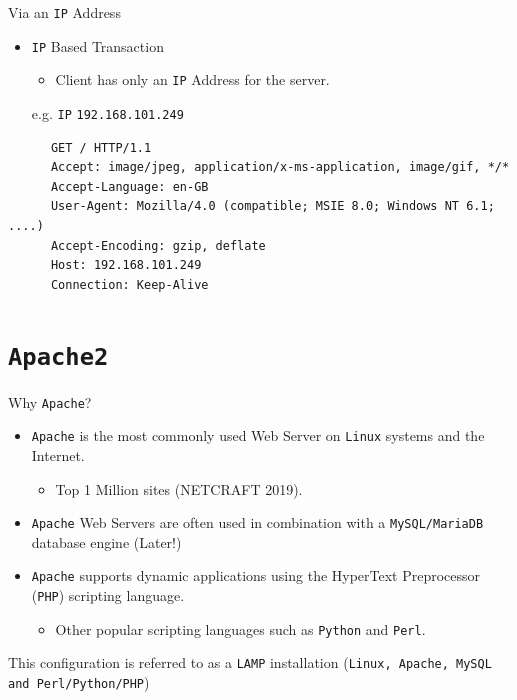 \documentclass[xcolor=table,aspectratio=169]{beamer}
\begin{document}
\begin{frame}[fragile]{Via an \texttt{IP} Address}
  \begin{itemize}
      \item \texttt{IP} Based Transaction
        \begin{itemize}
          \item Client has only an \texttt{IP} Address for the server.
        \end{itemize}
      \begin{center}
        e.g. \texttt{IP} \texttt{192.168.101.249}        
      \end{center}
    \end{itemize}
  \begin{tcolorbox}
    \lstset{
      basicstyle=\tiny\ttfamily,
    }
    \begin{lstlisting}
      GET / HTTP/1.1
      Accept: image/jpeg, application/x-ms-application, image/gif, */*
      Accept-Language: en-GB
      User-Agent: Mozilla/4.0 (compatible; MSIE 8.0; Windows NT 6.1; ....)
      Accept-Encoding: gzip, deflate
      Host: 192.168.101.249
      Connection: Keep-Alive
    \end{lstlisting}
  \end{tcolorbox}
\end{frame}

\section{\texttt{Apache2}}
\begin{frame}{Why \texttt{Apache}?}
  \begin{itemize}
    \item \texttt{Apache} is the most commonly used Web Server on \texttt{Linux} systems and the Internet.
      \begin{itemize}
        \item Top 1 Million sites (NETCRAFT 2019).
      \end{itemize}
    \item \texttt{Apache} Web Servers are often used in combination with a \texttt{MySQL/MariaDB} database engine (Later!)
    \item \texttt{Apache} supports dynamic applications using the HyperText Preprocessor (\texttt{PHP}) scripting language. 
      \begin{itemize}
        \item Other popular scripting languages such as \texttt{Python} and \texttt{Perl}.
      \end{itemize}
  \end{itemize}
  \begin{tcolorbox}
    \begin{center}
      \scriptsize This configuration is referred to as a \texttt{LAMP} installation (\texttt{Linux, Apache, MySQL and Perl/Python/PHP})
    \end{center}
  \end{tcolorbox}
\end{frame}
\end{document}
